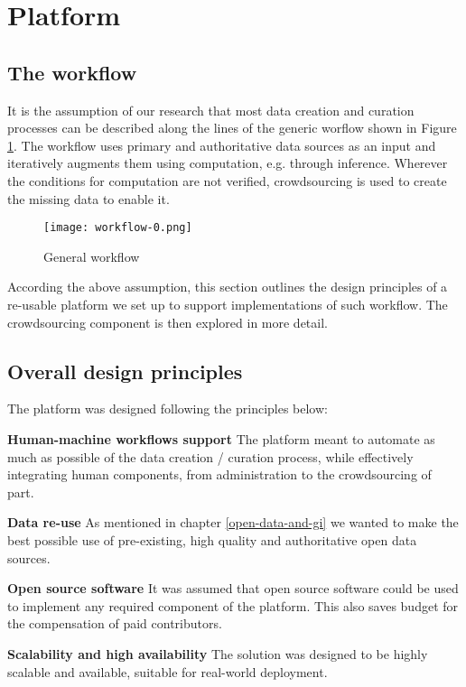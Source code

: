 \section{Platform}

\subsection{The workflow}
\label{generic-workflow}

It is the assumption of our research that most data creation and curation processes can be described along the lines of the generic worflow shown in Figure \ref{fig:workflow_0}. The workflow uses primary and authoritative data sources as an input and iteratively augments them using computation, e.g. through inference. Wherever the conditions for computation are not verified, crowdsourcing is used to create the missing data to enable it.

\begin{figure}
	\texttt{[image: workflow-0.png]}
	\caption{General workflow}
	\label{fig:workflow_0}
\end{figure}

According the above assumption, this section outlines the design principles of a re-usable platform we set up to support implementations of such workflow. The crowdsourcing component is then explored in more detail.

\subsection{Overall design principles}

The platform was designed following the principles below:

\textbf{Human-machine workflows support} The platform meant to automate as much as possible of the data creation / curation process, while effectively integrating human components, from administration to the crowdsourcing of part.

\textbf{Data re-use} As mentioned in chapter \ref{open-data-and-gi} we wanted to make the best possible use of pre-existing, high quality and authoritative open data sources.

\textbf{Open source software} It was assumed that open source software could be used to implement any required component of the platform. This also saves budget for the compensation of paid contributors.

\textbf{Scalability and high availability} The solution was designed to be highly scalable and available, suitable for real-world deployment.

